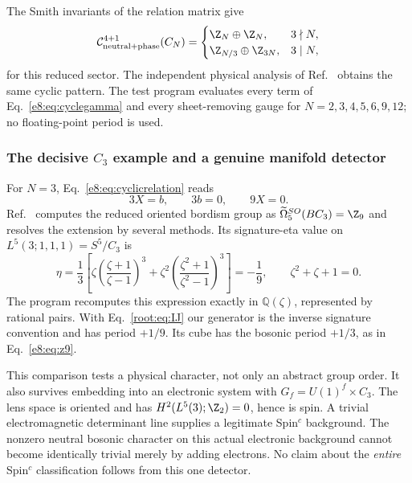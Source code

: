 The Smith invariants of the relation matrix give
\begin{equation}
 \mathcal C^{4+1}_{\mathrm{neutral+phase}}(C_N)=
 \begin{cases}
 \Z_N\oplus\Z_N,&3\nmid N,\\
 \Z_{N/3}\oplus\Z_{3N},&3\mid N,
 \end{cases}
 \label{e8:eq:cyclicgroup}
\end{equation}
for this reduced sector. The independent physical analysis of Ref.~\cite{YC} obtains the same cyclic pattern. The test program evaluates every term of Eq.~\eqref{e8:eq:cyclegamma} and every sheet-removing gauge for $N=2,3,4,5,6,9,12$; no floating-point period is used.

\subsubsection{The decisive $C_3$ example and a genuine manifold detector}
For $N=3$, Eq.~\eqref{e8:eq:cyclicrelation} reads
\begin{equation}
 3X=b,\qquad 3b=0,\qquad 9X=0.
 \label{e8:eq:z9}
\end{equation}
Ref.~\cite{STZ} computes the reduced oriented bordism group as $\widetilde\Omega_5^{SO}(BC_3)=\Z_9$ and resolves the extension by several methods. Its signature-eta value on $L^5(3;1,1,1)=S^5/C_3$ is
\begin{equation}
 \eta=\frac13\left[
 \zeta\left(\frac{\zeta+1}{\zeta-1}\right)^3
 +\zeta^2\left(\frac{\zeta^2+1}{\zeta^2-1}\right)^3\right]
 =-\frac19,
 \qquad \zeta^2+\zeta+1=0.
 \label{e8:eq:eta}
\end{equation}
The program recomputes this expression exactly in $\mathbb Q(\zeta)$, represented by rational pairs. With Eq.~\eqref{root:eq:IJ} our generator is the inverse signature convention and has period $+1/9$. Its cube has the bosonic period $+1/3$, as in Eq.~\eqref{e8:eq:z9}.

This comparison tests a physical character, not only an abstract group order. It also survives embedding into an electronic system with $G_f=U(1)^f\times C_3$. The lens space is oriented and has $H^2(L^5(3);\Z_2)=0$, hence is spin. A trivial electromagnetic determinant line supplies a legitimate Spin$^c$ background. The nonzero neutral bosonic character on this actual electronic background cannot become identically trivial merely by adding electrons. No claim about the \emph{entire} Spin$^c$ classification follows from this one detector.

